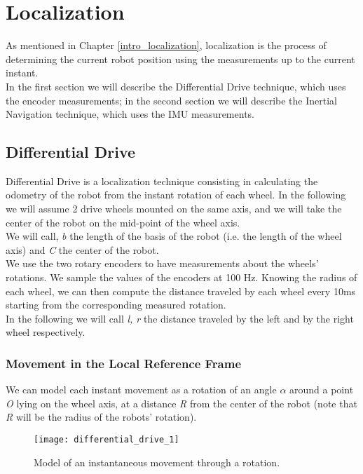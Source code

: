 \chapter{Localization}

As mentioned in Chapter \ref{intro_localization}, localization is the process of determining the current robot position using the measurements up to the 
current instant.\\
In the first section we will describe the Differential Drive technique, which uses the encoder measurements; in the second section we will describe the Inertial Navigation technique, which uses the IMU measurements.

\section{Differential Drive}

Differential Drive\supercite{diff_drive} is a localization technique consisting in calculating the odometry of the robot from the instant rotation of each wheel. In the following we will assume 2 drive wheels mounted on the same axis, and we will take the center of the robot on the mid-point of the wheel axis.\\
We will call, \textit{b} the length of the basis of the robot (i.e. the length of the wheel axis) and \textit{C} the center of the robot.\\

We use the two rotary encoders to have measurements about the wheels' rotations. We sample the values of the encoders at 100 Hz. Knowing the radius of each wheel, we can then compute the distance traveled by each wheel every 10ms starting from the corresponding measured rotation.\\
In the following we will call \textit{l, r} the distance traveled by the left and by the right wheel respectively.\\

\subsection{Movement in the Local Reference Frame}

We can model each instant movement as a rotation of an angle $\alpha$ around a point \textit{O} lying on the wheel axis, at a distance \textit{R} from the center of the robot (note that \textit{R} will be the radius of the robots' rotation).\\
\begin{figure}[!ht]
	\texttt{[image: differential\_drive\_1]}
	\captionsetup{justification=centering, margin=1.5cm}
	\centering
	\caption{Model of an instantaneous movement through a rotation.}
	\centering
\end{figure}


